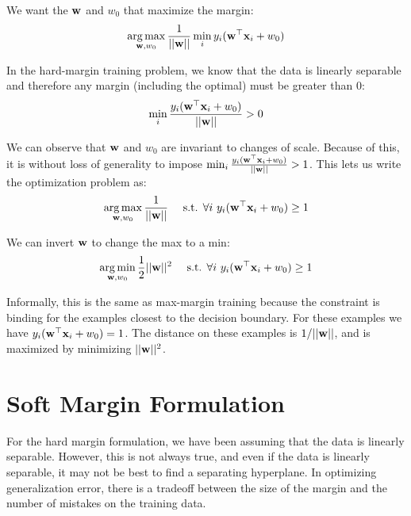 \documentclass[11pt,letterpaper]{article}
\begin{document}
\noindent{}

\medskip

\noindent We want the $\mathbf{w}$ and $w_0$ that maximize the margin:
$$\argmax_{\boldw,w_0} \frac{1}{||\boldw||} \min_i y_i(\boldw^\top\boldx_i+w_0)$$

\noindent In the hard-margin training problem, we know that the data is linearly separable and therefore any margin (including the optimal)  must be greater than 0:
%
$$
\min_{i} \frac{y_i(\mathbf{w}^\top\mathbf{x}_i + w_0)}{||\mathbf{w}||}>0
$$

\noindent We can observe that $\mathbf{w}$ and $w_0$ are invariant to changes of scale.
Because of this, it is without loss of generality to impose
$\min_{i} \frac{y_i(\mathbf{w}^\top\mathbf{x}_i + w_0)}{||\mathbf{w}||}>1$. This lets
us write the optimization problem as:
%
$$
\argmax_{\boldw, w_0} \frac{1}{||\boldw||} \quad \text{ s.t. }\forall i\text{ } y_i(\boldw^\top\boldx_i+w_0) \geq 1
$$

\noindent{}
\medskip
\noindent We can invert $\mathbf{w}$ to change the max to a min:
$$
\argmin_{\boldw, w_0} \frac{1}{2}||\boldw||^2 \quad \text{ s.t. }\forall i\text{ }
y_i(\boldw^\top\boldx_i+w_0) \geq 1$$

\noindent Informally, this is the same as max-margin training because the constraint
is binding for the examples closest to the decision boundary. For
these examples we have $y_i(\mathbf{w}^\top\mathbf{x}_i+w_0) = 1$.  The
distance on these examples is $1/||\mathbf{w}||$, and is maximized by
minimizing $||\mathbf{w}||^2$.


\section{Soft Margin Formulation}

For the hard margin formulation, we have been assuming that the data
is linearly separable. However, this is not always true, and even
if the data is linearly separable, it may not be best to find a
separating hyperplane. In optimizing generalization error, there is a
tradeoff between the size of the margin and the number of mistakes on
the training data.\\
\end{document}
